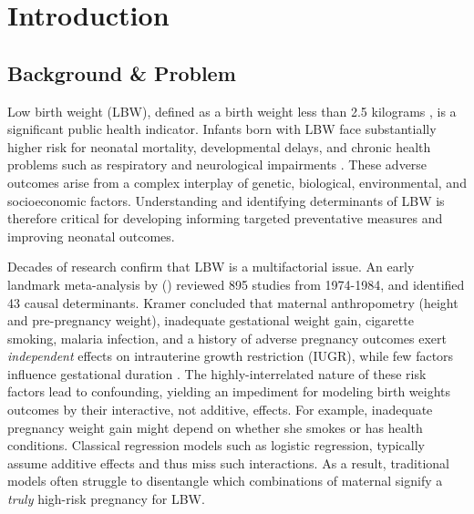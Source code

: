 \chapter{Introduction}
\label{chap:introduction}

\section{Background \& Problem}

Low birth weight (LBW), defined as a birth weight less than 2.5 kilograms \parencite{lbw_def, kramer1987}, is a significant public health indicator. Infants born with LBW face substantially higher risk for neonatal mortality, developmental delays, and chronic health problems such as respiratory and neurological impairments \parencite{finch2003}. These adverse outcomes arise from a complex interplay of genetic, biological, environmental, and socioeconomic factors. Understanding and identifying determinants of LBW is therefore critical for developing informing targeted preventative measures and improving neonatal outcomes. 

Decades of research confirm that LBW is a multifactorial issue. An early landmark meta-analysis by \textcite{kramer1987} (\citeyear{kramer1987}) reviewed 895 studies from 1974-1984, and identified 43 causal determinants. Kramer concluded that maternal anthropometry (height and pre-pregnancy weight), inadequate gestational weight gain, cigarette smoking, malaria infection, and a history of adverse pregnancy outcomes exert \emph{independent} effects on intrauterine growth restriction (IUGR), while few factors influence gestational duration \parencite{kramer1987}. The highly-interrelated nature of these risk factors lead to confounding, yielding an impediment for modeling birth weights outcomes by their interactive, not additive, effects. For example, inadequate pregnancy weight gain might depend on whether she smokes or has health conditions. Classical regression models such as logistic regression, typically assume additive effects and thus miss such interactions. As a result, traditional models often struggle to disentangle which combinations of maternal signify a \emph{truly} high-risk pregnancy for LBW. 

